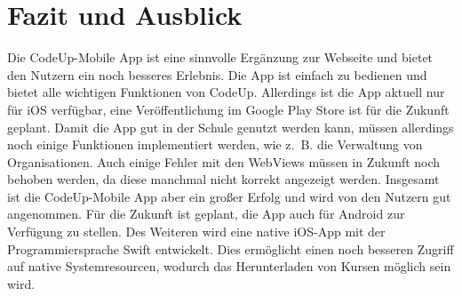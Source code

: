 \documentclass[main.tex]{subfiles}
\begin{document}
    \section{Fazit und Ausblick}
    Die CodeUp-Mobile App ist eine sinnvolle Ergänzung zur Webseite und bietet den Nutzern ein noch besseres Erlebnis.
    Die App ist einfach zu bedienen und bietet alle wichtigen Funktionen von CodeUp.
    Allerdings ist die App aktuell nur für iOS verfügbar, eine Veröffentlichung im Google Play Store ist für die Zukunft geplant.
    Damit die App gut in der Schule genutzt werden kann, müssen allerdings noch einige Funktionen implementiert werden, wie z.~B. die Verwaltung von Organisationen.
    Auch einige Fehler mit den WebViews müssen in Zukunft noch behoben werden, da diese manchmal nicht korrekt angezeigt werden.
    Insgesamt ist die CodeUp-Mobile App aber ein großer Erfolg und wird von den Nutzern gut angenommen.
    Für die Zukunft ist geplant, die App auch für Android zur Verfügung zu stellen.
    Des Weiteren wird eine native iOS-App mit der Programmiersprache Swift entwickelt.
    Dies ermöglicht einen noch besseren Zugriff auf native Systemresourcen, wodurch das Herunterladen von Kursen möglich sein wird.
\end{document}
